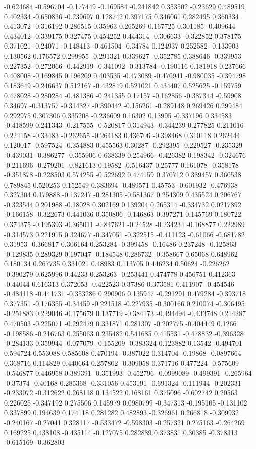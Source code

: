 -0.624684 -0.596704 -0.177449 -0.169584 -0.241842 0.353502 -0.23629 0.489519 0.402334 -0.650836 -0.239697 0.128742 0.397175 0.346061 0.282495 0.360334 0.413072 -0.316192 0.286515 0.35963 0.265269 0.167725 0.301185 -0.409644 0.434012 -0.339175 0.327475 0.454252 0.444314 -0.306633 -0.322852 0.378175 0.371021 -0.24071 -0.148413 -0.461504 -0.34784 0.124937 0.252582 -0.133903 0.130562 0.176572 0.299955 -0.291321 0.339627 -0.352785 0.388646 -0.339953 0.227352 -0.272066 -0.442919 -0.341092 -0.313784 -0.190116 0.181918 0.237666 0.408008 -0.169845 0.196209 0.403535 -0.473089 -0.470941 -0.980035 -0.394798 0.183649 -0.246637 0.512167 -0.432849 0.521021 0.434407 0.525625 -0.159759 0.478028 -0.280284 -0.481386 -0.241355 0.17157 -0.162856 -0.387344 -0.59908 0.34697 -0.313757 -0.314327 -0.390442 -0.156261 -0.289148 0.269426 0.299484 0.292975 0.307306 0.335208 -0.236609 0.16302 0.13995 -0.337196 0.334583 -0.418599 0.241343 -0.217555 -0.520817 0.314943 -0.344239 0.277825 0.211016 0.224158 -0.33483 -0.262655 -0.264183 0.436706 -0.398468 0.310118 0.262444 0.120017 -0.597524 -0.354883 0.455563 0.30287 -0.292395 -0.229527 -0.235329 -0.439031 -0.386277 -0.355906 0.638339 0.254966 -0.426382 0.198342 -0.324676 -0.211696 -0.279201 -0.821613 0.19582 -0.516437 0.25777 0.161078 -0.358178 -0.351878 -0.228503 0.574255 -0.522692 0.474159 0.370712 0.339457 0.360538 0.789845 0.520253 0.152549 0.383694 -0.489571 0.45753 -0.601932 -0.476938 0.327304 0.179888 -0.137247 -0.281305 -0.581367 0.254309 0.435524 0.206767 -0.323544 0.201988 -0.18028 0.302169 0.139204 0.265314 -0.334732 0.0217892 -0.166158 -0.322673 0.441036 0.350806 -0.146863 0.397271 0.145769 0.180722 0.374375 -0.195393 -0.365011 -0.847621 -0.24528 -0.234234 -0.168877 0.222989 -0.314573 0.221915 0.324677 -0.347051 -0.322515 -0.411123 -0.61066 -0.681782 0.31953 -0.366817 0.306164 0.253284 -0.399458 -0.16486 0.237248 -0.125863 -0.129835 0.289329 0.197047 -0.184548 0.286732 -0.358667 0.65068 0.648962 0.180134 0.267735 0.331021 0.48983 0.113705 0.446234 0.50624 -0.226262 -0.390279 0.625996 0.44233 0.253263 -0.253441 0.474778 0.456751 0.412363 -0.44044 0.616313 0.372053 -0.422523 0.37386 0.373581 0.411907 -0.454546 -0.484118 -0.441731 -0.353286 0.290906 0.135947 -0.291291 0.479284 -0.393718 0.377351 -0.176355 -0.34459 -0.221518 -0.227935 -0.300166 0.210074 -0.306495 -0.251883 0.229046 -0.175679 0.137719 -0.384173 -0.494494 -0.433748 0.214287 0.470503 -0.225071 -0.292479 0.331871 0.281307 -0.202775 -0.404449 0.1266 -0.198586 -0.216763 0.255063 0.235482 0.541685 0.415531 -0.478832 -0.396328 -0.284133 0.359944 -0.077079 -0.155209 -0.383324 0.123882 0.13542 -0.494701 0.594724 0.553088 0.585608 0.470194 -0.387022 0.314704 -0.19868 -0.0897664 0.368716 0.114829 0.440664 0.257802 -0.309058 0.371716 0.477224 -0.575609 -0.546877 0.446958 0.389391 -0.351993 -0.452796 -0.0999089 -0.499391 -0.265964 -0.37374 -0.40168 0.285368 -0.331056 0.453191 -0.691324 -0.111944 -0.202331 -0.233072 -0.312622 0.268118 0.134522 0.168161 0.375096 -0.602742 0.20563 0.226025 -0.347192 0.275506 0.145979 0.0980799 -0.347313 -0.195105 -0.131102 0.337899 0.194639 0.174118 0.281282 0.482893 -0.326961 0.266818 -0.309932 -0.240167 -0.27041 0.328117 -0.533472 -0.598303 -0.257321 0.275163 -0.264269 0.169225 0.438108 -0.435114 -0.127075 0.282889 0.373831 0.30385 -0.378313 -0.615169 -0.362803 